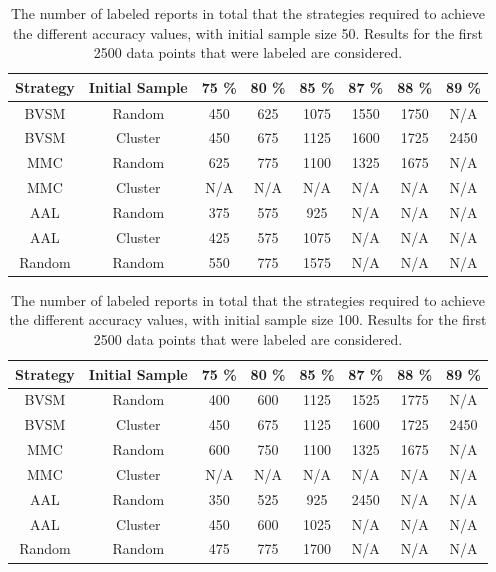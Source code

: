 \begin{table}
    \centering
    \begin{tabular}{|cccccccc|}
        \hline
        \textbf{Strategy} & \textbf{Initial Sample} & \textbf{75 \%} & \textbf{80 \%} & \textbf{85 \%} & \textbf{87 \%} & \textbf{88 \%} & \textbf{89 \%}\\
        \hline
        BVSM & Random & 450 & 625 & 1075 & 1550 & 1750 & N/A\\
        BVSM & Cluster & 450 & 675 & 1125 & 1600 & 1725 & 2450\\
        MMC & Random & 625 & 775 & 1100 & 1325 & 1675 & N/A\\
        MMC & Cluster & N/A & N/A & N/A & N/A & N/A & N/A\\
        AAL & Random & 375 & 575 & 925 & N/A & N/A & N/A\\
        AAL & Cluster & 425 & 575 & 1075 & N/A & N/A & N/A\\
        Random & Random & 550 & 775 & 1575 & N/A & N/A & N/A\\
        \hline
    \end{tabular}
    \caption{The number of labeled reports in total that the strategies required to achieve the different accuracy values, with initial sample size 50. Results for the first 2500 data points that were labeled are considered.}
    \label{tab:active-learning-accuracy-50}
\end{table}

\begin{table}
    \centering
    \begin{tabular}{|cccccccc|}
        \hline
        \textbf{Strategy} & \textbf{Initial Sample} & \textbf{75 \%} & \textbf{80 \%} & \textbf{85 \%} & \textbf{87 \%} & \textbf{88 \%} & \textbf{89 \%}\\
        \hline
        BVSM & Random & 400 & 600 & 1125 & 1525 & 1775 & N/A\\
        BVSM & Cluster & 450 & 675 & 1125 & 1600 & 1725 & 2450\\
        MMC & Random & 600 & 750 & 1100 & 1325 & 1675 & N/A\\
        MMC & Cluster & N/A & N/A & N/A & N/A & N/A & N/A\\
        AAL & Random & 350 & 525 & 925 & 2450 & N/A & N/A\\
        AAL & Cluster & 450 & 600 & 1025 & N/A & N/A & N/A\\
        Random & Random & 475 & 775 & 1700 & N/A & N/A & N/A\\
        \hline
    \end{tabular}
    \caption{The number of labeled reports in total that the strategies required to achieve the different accuracy values, with initial sample size 100. Results for the first 2500 data points that were labeled are considered.}
    \label{tab:active-learning-accuracy-100}
\end{table}

